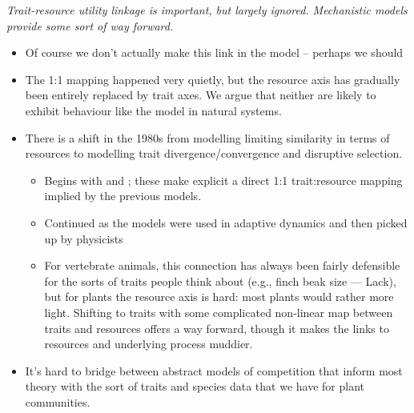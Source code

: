 \documentclass[a4paper,11pt]{article}
\begin{document}
\textit{Trait-resource utility linkage is important, but largely
  ignored.  Mechanistic models provide some sort of way forward.}
\begin{itemize}
\item Of course we don't actually make this link in the model --
  perhaps we should
\item The 1:1 mapping happened very quietly, but the resource axis has
  gradually been entirely replaced by trait axes.  We argue that
  neither are likely to exhibit behaviour like the
  \citet{MacArthur-1967} model in natural systems.
\item There is a shift in the 1980s from modelling limiting
  similarity in terms of resources to modelling trait
  divergence/convergence and disruptive selection.
  \begin{itemize}
  \item Begins with \citet{Taper-1985} and \citet{Brown-1987-140}; these
    make explicit a direct 1:1 trait:resource mapping implied by the
    previous models.
  \item Continued as the models were used in adaptive dynamics
    \citep[e.g.,][]{Dieckmann-1999} and then picked up by physicists
    \citep[e.g.,][]{Leimar-2013}
  \item For vertebrate animals, this connection has always been fairly
    defensible for the sorts of traits people think about (e.g., finch
    beak size --- Lack), but for plants the resource axis is hard: most
    plants would rather more light.  Shifting to traits with some
    complicated non-linear map between traits and resources offers a way
    forward, though it makes the links to resources and underlying
    process muddier.
  \end{itemize}
\item It's hard to bridge between abstract models of competition that
  inform most theory with the sort of traits and species data that we
  have for plant communities.
\end{itemize}
\end{document}
